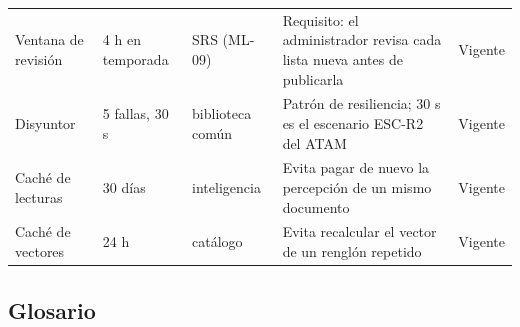 {\begin{longtable}{@{}p{2.6cm}p{4.3cm}p{1.9cm}p{3.7cm}p{1.5cm}@{}}
Ventana de revisión & 4 h en temporada & SRS (ML-09) & Requisito: el administrador revisa cada lista nueva antes de publicarla & Vigente \\
Disyuntor & 5 fallas, 30 s & biblioteca común & Patrón de resiliencia; 30 s es el escenario ESC-R2 del ATAM & Vigente \\
Caché de lecturas & 30 días & inteligencia & Evita pagar de nuevo la percepción de un mismo documento & Vigente \\
Caché de vectores & 24 h & catálogo & Evita recalcular el vector de un renglón repetido & Vigente \\
\end{longtable}
}

\subsection{Glosario}
\label{anx:glosario}

